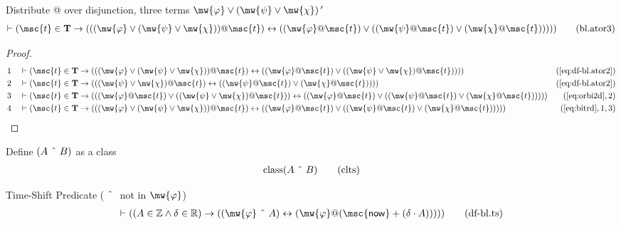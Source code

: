 \begin{lemma} Distribute @ over disjunction, three terms
$\mw{\varphi} \vee ( \mw{\psi} \vee \mw{\chi} ) \,\mathrm{{\tt '}}$
\begin{align}
\vdash ( \msc{t} \in \mathbf{T} \rightarrow ( ( ( \mw{\varphi} \vee ( \mw{\psi}
    \vee \mw{\chi} ) ) @ \msc{t} ) \leftrightarrow ( ( \mw{\varphi} @ \msc{t} )
    \vee ( ( \mw{\psi} @ \msc{t} ) \vee ( \mw{\chi} @ \msc{t} ) ) ) )
    )\label{eq:bl.ator3}\tag{bl.ator3}
\end{align}
\end{lemma}

\begin{proof}
\begin{align}
  1 &&  & \vdash ( \msc{t} \in \mathbf{T} \rightarrow ( ( ( \mw{\varphi} \vee ( \mw{\psi} \vee \mw{\chi} ) ) @ \msc{t} ) \leftrightarrow ( ( \mw{\varphi} @ \msc{t} ) \vee ( ( \mw{\psi} \vee \mw{\chi} ) @ \msc{t} ) ) ) )&(\mbox{\ref{eq:df-bl.ator2}})\notag
  \\ 2 &&  & \vdash ( \msc{t} \in \mathbf{T} \rightarrow ( ( ( \mw{\psi} \vee \mw{\chi} ) @ \msc{t} ) \leftrightarrow ( ( \mw{\psi} @ \msc{t} ) \vee ( \mw{\chi} @ \msc{t} ) ) ) )&(\mbox{\ref{eq:df-bl.ator2}})\notag
  \\ 3 &&  & \vdash ( \msc{t} \in \mathbf{T} \rightarrow ( ( ( \mw{\varphi} @ \msc{t} ) \vee ( ( \mw{\psi} \vee \mw{\chi} ) @ \msc{t} ) ) \leftrightarrow ( ( \mw{\varphi} @ \msc{t} ) \vee ( ( \mw{\psi} @ \msc{t} ) \vee ( \mw{\chi} @ \msc{t} ) ) ) ) )&(\mbox{\ref{eq:orbi2d}},2)\notag
  \\ 4 &&  & \vdash ( \msc{t} \in \mathbf{T} \rightarrow ( ( ( \mw{\varphi} \vee ( \mw{\psi} \vee \mw{\chi} ) ) @ \msc{t} ) \leftrightarrow ( ( \mw{\varphi} @ \msc{t} ) \vee ( ( \mw{\psi} @ \msc{t} ) \vee ( \mw{\chi} @ \msc{t} ) ) ) ) )&(\mbox{\ref{eq:bitrd}},1,3)\notag
\end{align}
\end{proof}

\begin{metadefinition} Define $( A ~\string^~ B )$ as a class
\begin{align}
{\rm class} ( A ~\string^~ B )\label{eq:clts}\tag{clts}
\end{align}
\end{metadefinition}

\begin{metadefinition} Time-Shift Predicate ($~\string^~$ not
in $\mw{\varphi}$)
\begin{align}
\vdash ( ( A \in \mathbb{Z} \wedge \delta \in \mathbb{R} ) \rightarrow ( (
    \mw{\varphi} ~\string^~ A ) \leftrightarrow ( \mw{\varphi} @ (
    \mathsf{\msc{now}} + ( \delta \cdot A ) ) ) )
    )\label{eq:df-bl.ts}\tag{df-bl.ts}
\end{align}
\end{metadefinition}

